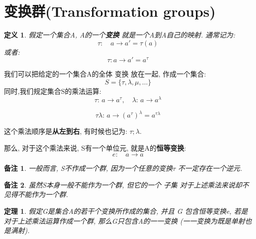 \documentclass[utf8]{ctexbook}
\newtheorem{theorem}{定理}[section]
\newtheorem{definition}{定义}[section]
\newtheorem{memo}{备注}[section]
\begin{document}
\section{变换群(Transformation groups)}

\begin{definition}
假定一个集合A, A的一个\textbf{变换} 就是一个A到A自己的映射. 通常记为:
\begin{equation}
\tau: \quad a \longrightarrow a' = \tau(a)
\end{equation}
或者:
\begin{equation}
\tau: a \longrightarrow a' = a^{\tau}
\end{equation}
\end{definition}

我们可以把给定的一个集合A的全体 变换 放在一起, 作成一个集合:
\begin{equation}
S = \{ \tau, \lambda, \mu, \ldots  \}
\end{equation}
同时,我们规定集合S的乘法运算:
\begin{equation}
\tau: \, a \longrightarrow a^{\tau}, \quad \lambda: \, a \longrightarrow a^{\lambda}
\end{equation}

\begin{equation}
\tau  \lambda : \, a \longrightarrow (a^{\tau})^{\lambda} = a^{\tau \lambda}
\end{equation}

这个乘法顺序是\textbf{从左到右}, 有时候也记为: $\tau ; \lambda $.

那么, 对于这个乘法来说, S有一个单位元, 就是A的\textbf{恒等变换}:
\begin{equation}
e: \quad a \longrightarrow a
\end{equation}

\begin{memo}
一般而言, S不作成一个群, 因为一个任意的变换$\tau$ 不一定存在一个逆元.
\end{memo}

\begin{memo}
虽然S本身一般不能作为一个群, 但它的一个 {\em 子集} 对于上述乘法来说却不见得不能作为一个群.
\end{memo}

\begin{theorem}
假定G是集合A的若干个变换所作成的集合, 并且 G 包含恒等变换e, 若是对于上述乘法运算作成一个群, 那么G只包含A的一一变换 (一一变换为既是单射也是满射). \label{thm_tau_group_nec_condition}
\end{theorem}
\end{document}
